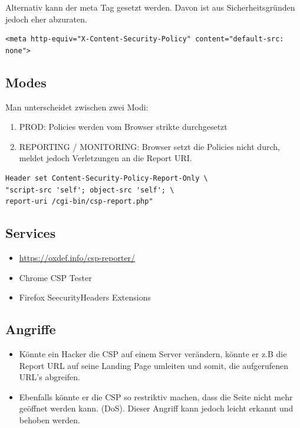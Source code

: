 Alternativ kann der meta Tag gesetzt werden. Davon ist aus Sicherheitsgründen jedoch eher abzuraten.

\begin{lstlisting}
<meta http-equiv="X-Content-Security-Policy" content="default-src: none">
\end{lstlisting}

\subsection{Modes}
Man unterscheidet zwischen zwei Modi:
\begin{enumerate}
	\item PROD: Policies werden vom Browser strikte durchgesetzt
	\item REPORTING / MONITORING: Browser setzt die Policies nicht durch, meldet jedoch Verletzungen an die Report URI.
\end{enumerate}

\begin{lstlisting}
Header set Content-Security-Policy-Report-Only \
"script-src 'self'; object-src 'self'; \
report-uri /cgi-bin/csp-report.php"
\end{lstlisting}

\subsection{Services}
\begin{itemize}
	\item \url{https://oxdef.info/csp-reporter/}
	\item Chrome CSP Tester
	\item Firefox SeecurityHeaders Extensions
\end{itemize}

\subsection{Angriffe}
\begin{itemize}
	\item Könnte ein Hacker die CSP auf einem Server verändern, könnte er z.B die Report URL auf seine Landing Page umleiten und somit, die aufgerufenen URL's abgreifen.
	\item Ebenfalls könnte er die CSP so restriktiv machen, dass die Seite nicht mehr geöffnet werden kann. (DoS). Dieser Angriff kann jedoch leicht erkannt und behoben werden.
\end{itemize}

